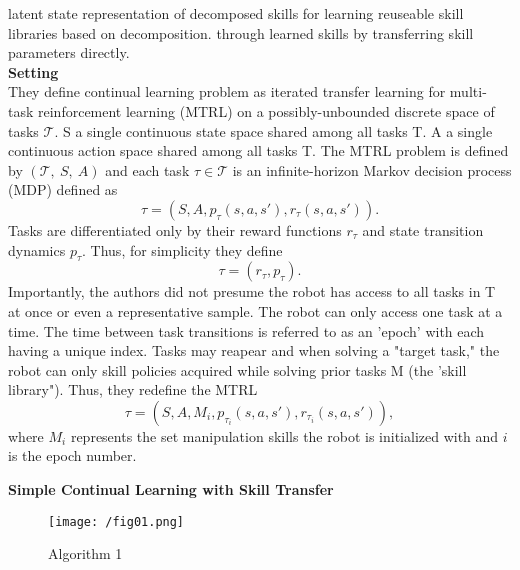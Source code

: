 \documentclass[12pt]{article}
\begin{document}
latent state representation of decomposed
skills for learning reuseable skill libraries based on decomposition.
    through  learned skills by transferring skill parameters directly.\\


\noindent
\textbf{Setting}\\
They define continual learning problem as iterated transfer learning for
multi-task reinforcement learning (MTRL) on a possibly-unbounded discrete space
of tasks \(\mathcal{T}\).
S a single continuous state space shared among all tasks T.
A a single continuous action space shared among all tasks T.
The MTRL problem is defined by \((\mathcal{T},~S,~A)\) and each task
\(\tau \in \mathcal{T}\) is an infinite-horizon Markov decision process (MDP)
defined as
\begin{equation}
\tau = \left(S, A, p_{\tau} (s,a,s'), r_{\tau} (s,a,s') \right).
\end{equation}
\noindent
Tasks are differentiated only by their reward functions \(r_{\tau}\) and
state transition dynamics \(p_{\tau}\). Thus, for simplicity they define
\begin{equation}
\tau = \left( r_{\tau}, p_{\tau}\right).
\end{equation}
\noindent
Importantly, the authors did not presume the robot has access to all tasks in
T at once or even a representative sample. The robot can only access one task at
a time. The time between task transitions is referred to as an 'epoch' with
each having a unique index. Tasks may reapear and when solving a "target task,"
the robot can only skill policies acquired while solving prior tasks M (the
'skill library"). Thus, they redefine the MTRL
\begin{equation}
\tau = \left(S, A, M_{i}, p_{\tau_{i}} (s,a,s'), r_{\tau_{i}} (s,a,s') \right),
\end{equation}
\noindent
where \(M_i\) represents the set manipulation skills the robot is initialized
with and \(i\) is the epoch number.


\noindent
\textbf{Simple Continual Learning with Skill Transfer}\\
\begin{figure}[h]
  \centering
  \texttt{[image: /fig01.png]}
  \caption{Algorithm 1}
\end{figure}







\newpage


\end{document}
